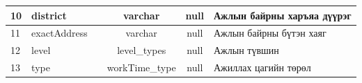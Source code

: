 \begin{table}[ht]
\begin{tabular}{|l|l|c|c|c|l|}
  10                               & district                                  &                                                                     & varchar                                                            & null                                                           & Ажлын байрны харъяа дүүрэг                                                             \\ \hline
  11                               & exactAddress                              &                                                                     & varchar                                                            & null                                                           & Ажлын байрны бүтэн хаяг                                                                \\ \hline
  12                               & level                                     &                                                                     & level\_types                                                       & null                                                           & Ажлын түвшин                                                                           \\ \hline
  13                               & type                                      &                                                                     & workTime\_type                                                     & null                                                           & Ажиллах цагийн төрөл                                                                   \\ \hline
  \end{tabular}
  \end{table}
